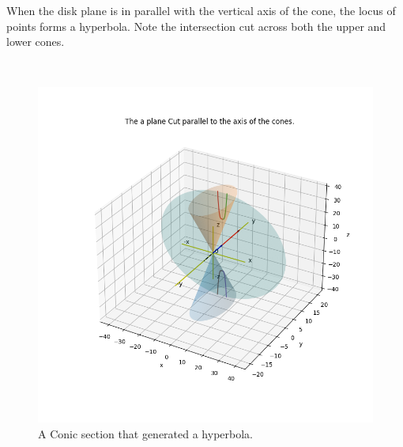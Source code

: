 \documentclass[10pt,a4paper,leqno]{article}
\begin{document}
\begin{CJK*}{UTF8}{gbsn}
\noindent When the disk plane is in parallel with the vertical axis of the cone,    the locus of points forms a hyperbola. Note the intersection cut across    both the upper and lower cones.
 \par \ \par\begin{figure}[H]
\centering\includegraphics[width=1\linewidth,height=0.7\textheight]{Data/fgr06.png}
\caption{A Conic section that generated a hyperbola. }
\label{fig:Data/fgr06.png}
\end{figure}

\noindent \nocite{2}
 \par \ \par\noindent \nocite{3}
 \par \ \par\noindent \nocite{7}
 \par \ \par\noindent \nocite{8}
 \par \ \par\noindent \nocite{9}
 \par \ \par\noindent \nocite{11}
 \par \ \par\noindent \nocite{13}
 \par \ \par\noindent \nocite{15}
 \par \ \par\noindent \nocite{202}
 \par \ \par\noindent \nocite{203}
 \par \ \par\noindent  
 
 \par \ \par\noindent \end{CJK*}
 \par \ \par
\end{document}
